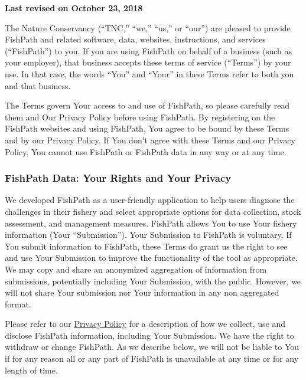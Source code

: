 \documentclass[
  11pt,
]{book}
\begin{document}
\textbf{Last revised on October 23, 2018}

The Nature Conservancy (``TNC,'' ``we,'' ``us,'' or ``our'') are pleased to provide FishPath and related software, data, websites, instructions, and services (``FishPath'') to you. If you are using FishPath on behalf of a business (such as your employer), that business accepts these terms of service (``Terms'') by your use. In that case, the words ``You'' and ``Your'' in these Terms refer to both you and that business.

The Terms govern Your access to and use of FishPath, so please carefully read them and Our Privacy Policy before using FishPath. By registering on the FishPath websites and using FishPath, You agree to be bound by these Terms and by our Privacy Policy. If You don't agree with these Terms and our Privacy Policy, You cannot use FishPath or FishPath data in any way or at any time.

\hypertarget{fishpath-data-your-rights-and-your-privacy}{%
\subsubsection*{FishPath Data: Your Rights and Your Privacy}\label{fishpath-data-your-rights-and-your-privacy}}

We developed FishPath as a user-friendly application to help users diagnose the challenges in their fishery and select appropriate options for data collection, stock assessment, and management measures. FishPath allows You to use Your fishery information (Your ``Submission''). Your Submission to FishPath is voluntary. If You submit information to FishPath, these Terms do grant us the right to see and use Your Submission to improve the functionality of the tool as appropriate. We may copy and share an anonymized aggregation of information from submissions, potentially including Your Submission, with the public. However, we will not share Your submission nor Your information in any non aggregated format.

Please refer to our \href{https://www.nature.org/en-us/about-us/who-we-are/accountability/privacy-policy/}{Privacy Policy} for a description of how we collect, use and disclose FishPath information, including Your Submission. We have the right to withdraw or change FishPath. As we describe below, we will not be liable to You if for any reason all or any part of FishPath is unavailable at any time or for any length of time.
\end{document}
